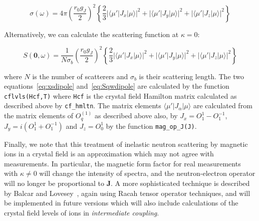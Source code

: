 \documentclass[12pt,onecolumn,tightenlines,aps,amsmath,floatfix,notitlepage,nofootinbib]{revtex4}
\newcommand{\V}[1]{\mathbf{#1}}
\newcommand{\bra}[1]{\langle #1|}
\newcommand{\ket}[1]{|#1\rangle}
\begin{document}
\begin{equation} \label{eq:xsdipole}
\sigma(\omega) = 4\pi \left(\frac{r_0 g_J}{2}\right)^2 \left\{ \frac{2}{3} |\bra{\mu'}J_x\ket{\mu}|^2 + |\bra{\mu'}J_y\ket{\mu}|^2 + |\bra{\mu'}J_z\ket{\mu}|^2 \right\}
\end{equation}

Alternatively, we can calculate the scattering function at $\kappa=0$:

\begin{equation} \label{eq:Sqwdipole}
S(\V{0},\omega) = \frac{1}{N\sigma_b} \left(\frac{r_0 g_J}{2}\right)^2 \left\{ \frac{2}{3} |\bra{\mu'}J_x\ket{\mu}|^2 + |\bra{\mu'}J_y\ket{\mu}|^2 + |\bra{\mu'}J_z\ket{\mu}|^2 \right\}
\end{equation}

\noindent where $N$ is the number of scatterers and $\sigma_b$ is their scattering length. The two equations~\ref{eq:xsdipole} and~\ref{eq:Sqwdipole} are calculated by the function \texttt{cflvls(Hcf,T)} where \texttt{Hcf} is the crystal field Hamilton matrix calculated as described above by \texttt{cf\_hmltn}. The matrix elements $\bra{\mu'}J_\alpha\ket{\mu}$ are calculated from the matrix elements of $O_q^{(1)}$ as described above also, by $J_x = O_1^1 - O_1^{-1}$, $J_y = i (O_1^1 + O_1^{-1})$ and $J_z = O_0^1$ by the function \texttt{mag\_op\_J(J)}.

Finally, we note that this treatment of inelastic neutron scattering by magnetic ions in a crystal field is an approximation which may not agree with measurements. In particular, the magnetic form factor for real measurements with $\kappa \neq 0$ will change the intensity of spectra, and the neutron-electron operator will no longer be proportional to $\V{J}$. A more sophisticated technique is described by Balcar and Lovesey~\cite{balcarlovesey}, again using Racah tensor operator techniques, and will be implemented in future versions which will also include calculations of the crystal field levels of ions in \emph{intermediate coupling}.




\end{document}

